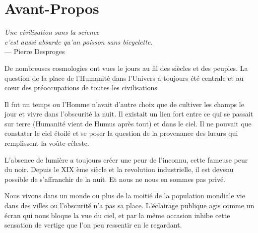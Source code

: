 
\chapter*{Avant-Propos}

\begin{flushright}{\slshape    
	Une civilisation sans la science \\
	c'est aussi absurde qu'un poisson sans bicyclette.} \\ \medskip 
	--- Pierre Desproges
\end{flushright}

\vspace{0.5cm}

De nombreuses cosmologies ont vues le jours au fil des siècles et des peuples.
La question de la place de l'Humanité dans l'Univers a toujours été centrale et au cœur des préoccupations de toutes les civilisations.

Il fut un temps ou l'Homme n'avait d'autre choix que de cultiver les champs le jour et vivre dans l'obscurité la nuit.
Il existait un lien fort entre ce qui se passait sur terre (Humanité vient de Humus après tout) et dans le ciel.
Il ne pouvait que constater le ciel étoilé et se poser la question de la provenance des lueurs qui remplissent la voûte céleste.

L’absence de lumière a toujours créer une peur de l'inconnu, cette fameuse peur du noir.
Depuis le XIX ème siècle et la revolution industrielle, il est devenu possible de s'affranchir de la nuit.
Et nous ne nous en sommes pas privé.

Nous vivons dans un monde ou plus de la moitié de la population mondiale vie dans des villes ou l'obscurité n'a pas sa place.
L’éclairage publique agis comme un écran qui nous bloque la vue du ciel, et par la même occasion inhibe cette sensation de vertige que l'on peu ressentir en le regardant.

